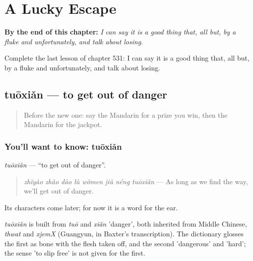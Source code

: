 
\chapter{A Lucky Escape}
\label{ch:zh-a-lucky-escape}

\begin{chapteropening}
\textbf{By the end of this chapter:} \emph{I can say it is a good thing that, all but, by a fluke and unfortunately, and talk about losing.}

Complete the last lesson of chapter 531: I can say it is a good thing that, all but, by a fluke and unfortunately, and talk about losing.
\end{chapteropening}

\section[tuōxiǎn]{tuōxiǎn — to get out of danger}

\label{lesson:ZH-C531-tuoxian}



\begin{quote}
Before the new one: say the Mandarin for a prize you win, then the Mandarin for the jackpot.
\end{quote}

\subsection*{You'll want to know: tuōxiǎn}
\emph{tuōxiǎn} — \textquotedblleft{}to get out of danger\textquotedblright{}.

\begin{quote}
\emph{zhǐyào zhǎo dào lù wǒmen jiù néng tuōxiǎn} — As long as we find the way, we'll get out of danger.
\end{quote}

Its characters come later; for now it is a word for the ear.

\begin{cousinweb}
\emph{tuōxiǎn} is built from \emph{tuō} and \emph{xiǎn} 'danger', both inherited from Middle Chinese, \emph{thwat} and \emph{xjemX} (Guangyun, in Baxter's transcription). The dictionary glosses the first as bone with the flesh taken off, and the second 'dangerous' and 'hard'; the sense 'to slip free' is not given for the first.
\end{cousinweb}

